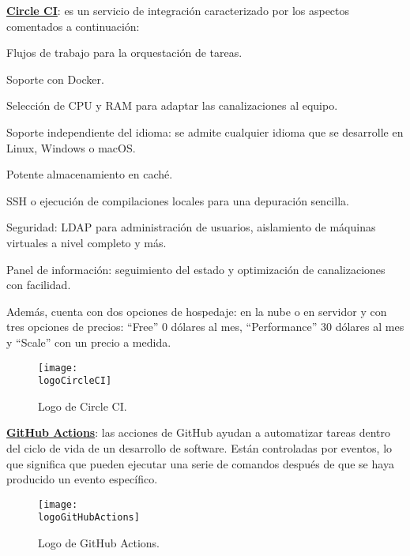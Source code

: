 \begin{compactitem}
    \item \textbf{\underline{Circle CI}}: es un servicio de integración caracterizado por los aspectos comentados a continuación:
    \begin{compactitem}
        \item Flujos de trabajo para la orquestación de tareas.
        \item Soporte con Docker.
        \item Selección de CPU y RAM para adaptar las canalizaciones al equipo.
        \item Soporte independiente del idioma: se admite cualquier idioma que se desarrolle en Linux, Windows o macOS.
        \item Potente almacenamiento en caché.
        \item SSH o ejecución de compilaciones locales para una depuración sencilla.
        \item Seguridad: LDAP para administración de usuarios, aislamiento de máquinas virtuales a nivel completo y más.
        \item Panel de información: seguimiento del estado y optimización de canalizaciones con facilidad.
    \end{compactitem}
    Además, cuenta con dos opciones de hospedaje: en la nube o en servidor y con tres opciones de precios: ``Free'' 0 dólares al mes, ``Performance'' 30 dólares al mes y ``Scale'' con un precio a medida.
    \begin{figure}[h]
        \centering
        \texttt{[image: \\logoCircleCI]}
        \caption{Logo de Circle CI.}
    \end{figure}
    \item \textbf{\underline{GitHub Actions}}: las acciones de GitHub ayudan a automatizar tareas dentro del ciclo de vida de un desarrollo de software. Están controladas por eventos, lo que significa que pueden ejecutar una serie de comandos después de que se haya producido un evento específico.
    
    \begin{figure}[h]
        \centering
        \texttt{[image: \\logoGitHubActions]}
        \caption{Logo de GitHub Actions.}
    \end{figure}
    

\end{compactitem}
